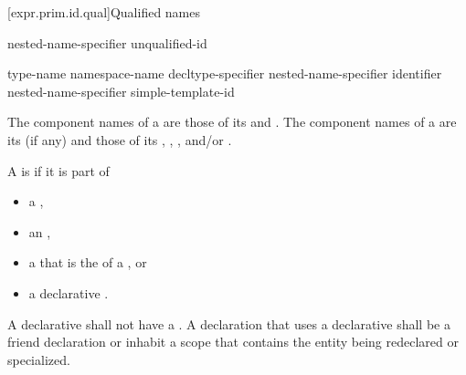 [expr.prim.id.qual]{Qualified names}

%
%
%
\begin{bnf}
\br
    nested-name-specifier  unqualified-id
\end{bnf}

%
%
%
\begin{bnf}
\br
    \terminal{::}\br
    type-name \terminal{::}\br
    namespace-name \terminal{::}\br
    decltype-specifier \terminal{::}\br
    nested-name-specifier identifier \terminal{::}\br
    nested-name-specifier  simple-template-id \terminal{::}
\end{bnf}

\pnum
{}%
The component names of a  are those of
its  and .
The component names of a  are
its  (if any) and those of its
,
,
, and/or
.

\pnum
A  is  if it is part of
\begin{itemize}
\item
a ,
\item
an ,
\item
a 
that is the  of a , or
\item
a declarative .
\end{itemize}
A declarative 
shall not have a .
A declaration that uses a declarative 
shall be a friend declaration or
inhabit a scope that contains the entity being redeclared or specialized.


